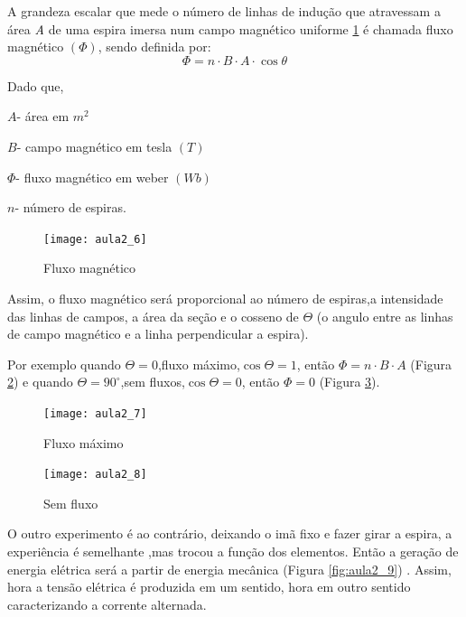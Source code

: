 A grandeza escalar que mede o número de linhas de indução que atravessam
a área \textit{\textcolor{black}{A }}de uma espira imersa num campo
magnético uniforme \ref{fig:aula2_6} é chamada fluxo magnético $(\Phi)$, sendo definida
por:
\begin{equation}\label{eq:fluxomag}
\Phi=n\cdot B\cdot A\cdot\cos\theta 
\end{equation}


Dado que,

$A$- área em $m^{2}$

$B$- campo magnético em tesla $(T)$

$\Phi$- fluxo magnético em weber $(Wb)$

$n$- número de espiras.




\begin{figure}[H]
\begin{centering}
\texttt{[image: aula2\_6]}\protect\caption{\label{fig:aula2_6}Fluxo magnético }
\end{centering}

\end{figure}
Assim, o fluxo magnético será proporcional ao número de espiras,a
intensidade das linhas de campos, a área da seção e o cosseno de $\Theta$
(o angulo entre as linhas de campo magnético e a linha perpendicular
a espira). 

Por exemplo quando $\Theta=0$,fluxo máximo,$\cos\Theta=1$, então
$\Phi=n\cdot B\cdot A$ (Figura \ref{fig:aula2_7}) e quando $\Theta=90^{\circ}$,sem fluxos,$\cos\Theta=0$,
então $\Phi=0$ (Figura \ref{fig:aula2_8}).

\begin{figure}[H]
\begin{centering}
\texttt{[image: aula2\_7]}\protect\caption{\label{fig:aula2_7}Fluxo máximo }
\end{centering}

\end{figure}
\begin{figure}[H]
\begin{centering}
\texttt{[image: aula2\_8]}\protect\caption{\label{fig:aula2_8}Sem fluxo }
\end{centering}

\end{figure}

O outro experimento é ao contrário, deixando o imã fixo e fazer girar
a espira, a experiência é semelhante ,mas trocou a função dos elementos.
Então a geração de energia elétrica será a partir de energia mecânica (Figura
\ref{fig:aula2_9}) . Assim, hora a tensão elétrica é produzida em um sentido, hora
em outro sentido caracterizando a corrente alternada.

